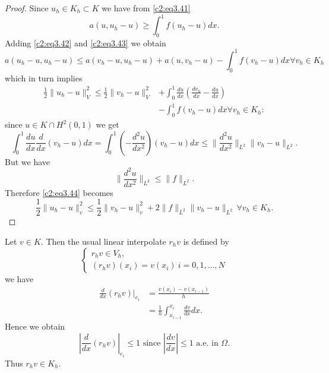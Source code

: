 \begin{proof}
Since  $u_h \in K_h \subset K$ we have from \eqref{c2:eq3.41}
\begin{equation}
a(u, u_h - u) \geq \int^1_0 f (u_h -u) dx. \tag{3.43}\label{c2:eq3.43} 
\end{equation}
Adding \eqref{c2:eq3.42} and \eqref{c2:eq3.43} we obtain 
$$
a(u_h-u,u_h-u) \leq a(v_h-u,u_h-u) + a (u,v_h-u) - \int^1_0 f(v_h-u)dx
\forall v_h \in K_h 
$$
which in turn implies 
\begin{align*}
\frac{1}{2} \parallel u_h-u\parallel^2_V \leq \frac{1}{2} \parallel
v_h-u\parallel^2_V & + \int^1_0 
\frac{du}{dx}\left(\frac{dv_h}{dx}-\frac{du}{dx}\right)\\
& -\int^1_0 f (v_h-u) dx
\forall v_h \in K_h :  \tag{3.44}\label{c2:eq3.44} 
\end{align*}
since 
$u \in K \cap H^2 (0,1)$ we get 
$$
\int^1_0 \frac{du}{dx}\frac{d}{dx}(v_h -u) dx= \int^1_0
\left(-\frac{d^2u}{dx^2}\right) (v_h-u) dx \leq  \parallel \frac{d^2u}{dx^2}\parallel_{ L^2}
\parallel v_h-u\parallel_{L^2} . 
$$
But we have 
\begin{equation}
\parallel \frac{d^2u}{dx^2}\parallel_{ L^2} \leq \parallel f\parallel_{L^2}. \tag{3.45}\label{c2:eq3.45} 
\end{equation}
Therefore \eqref{c2:eq3.44} becomes 
\begin{equation}
\frac{1}{2} \parallel u_h -u\parallel^2_v \leq \frac{1}{2} \parallel v_h-u\parallel^2_v  + 2 \parallel f
\parallel_{L^2} \parallel v_h - u\parallel_{L^2}\, \forall  v_h \in K_h. \tag{3.46}\label{c2:eq3.46} 
\end{equation}
\end{proof}
Let $v \in K$. Then the usual linear interpolate $r_h v$  is
defined by  
\begin{equation}
\begin{cases}
r_h v \in V_h,\\
(r_h v) (x_i) = v(x_i)~ i=0, 1, \ldots, N \tag{3.47}\label{c2:eq3.47}
 \end{cases}
 \end{equation}\pageoriginale 
 we have 
\begin{align*}
 \frac{d}{dx}(r_h v)|_{e_i} & = \frac{v(x_i) - v (x_{i-1})} {h}\\
& = \frac{1}{h}\int^{x_i}_{x_{i-1}} \frac{dv}{dx} dx.
\end{align*}
Hence we obtain 
\begin{equation}
|\frac{d}{dx}(r_hv) |_{e_i} \leq 1 \text{ since }|\frac{dv}{dx}|\leq 1
\text{ a.e. in }\Omega. \tag{3.48}\label{c2:eq3.48} 
\end{equation}
Thus $r_h v \in K_h$.

